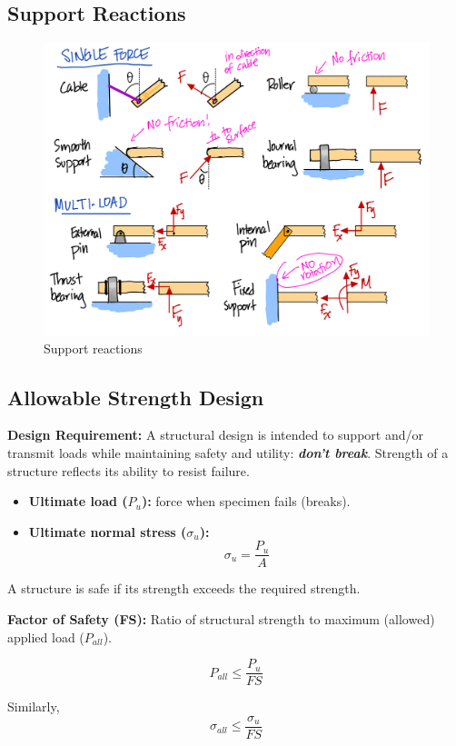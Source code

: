 \clearpage

\subsection{Support Reactions}

\begin{figure}[!h]
\centering
\includegraphics[angle=0, width=\columnwidth]{Stress-Figures/Support reactions.png}
\vspace{-2mm}
\caption{\small Support reactions}
\vspace{-3mm}
\label{Fig:Supports}
\end{figure}

\subsection{Allowable Strength Design}

\textbf{Design Requirement:} A structural design is intended to support and/or transmit loads while maintaining safety and utility: \textbf{\textit{don't break}}. Strength of a structure reflects its ability to resist failure.

\begin{itemize}
    \item \textbf{Ultimate load ($P_u$):} force when specimen fails (breaks).
    \item \textbf{Ultimate normal stress ($\sigma_u$):} \[\sigma_u = \frac{P_u}{A}\]
\end{itemize}

\noindent A structure is safe if its strength exceeds the required strength.

\noindent \textbf{Factor of Safety (FS):} Ratio of structural strength to maximum (allowed) applied load ($P_{all}$).

\[P_{all} \le \frac{P_u}{FS}\]

\noindent Similarly, \[\sigma_{all} \le \frac{\sigma_u}{FS}\]


